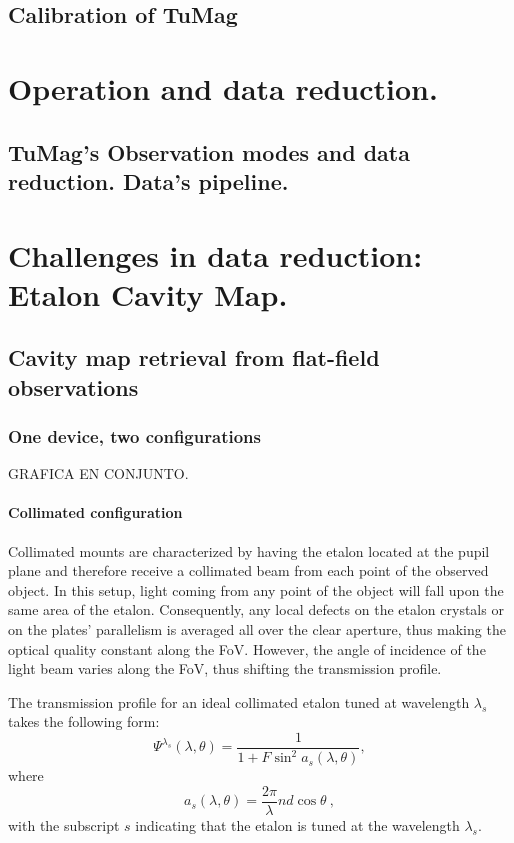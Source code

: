 \documentclass[12pt]{mythesis}
\begin{document}
\section{Calibration of TuMag}

\chapter{\label{CH:Pipeline}Operation and data reduction.}

\section{TuMag's Observation modes and data reduction. Data's pipeline.}

\chapter{\label{CH:}Challenges in data reduction: Etalon Cavity Map.}

\section{\label{ch3: cavity map}Cavity map retrieval from flat-field observations}



\subsection{One device, two configurations}

GRAFICA EN CONJUNTO.

\subsubsection{Collimated configuration}

Collimated mounts are characterized by having the etalon located at the pupil plane and therefore receive a collimated beam from each point of the observed object. In this setup, light coming from any point of the object will fall upon the same area of the etalon. Consequently, any local defects on the etalon crystals or on the plates' parallelism is averaged all over the clear aperture, thus making the optical quality constant along the FoV. However, the angle of incidence of the light beam varies along the FoV, thus shifting the transmission profile.  

 The transmission profile for an ideal collimated etalon tuned at wavelength $\lambda _ s$ takes the following form:
\begin{equation}
\Psi ^{\lambda _ s} (\lambda, \theta) = \frac{1}{1 + F \sin ^2 a_s (\lambda,\theta) },
\end{equation}
where
\begin{equation}
a_s (\lambda, \theta) =\frac{2  \pi}{\lambda} nd\cos \theta  \ ,
\label{eq: a-def}
\end{equation}
with the subscript $s$ indicating that the etalon is tuned at the wavelength $\lambda_s$.
\end{document}
